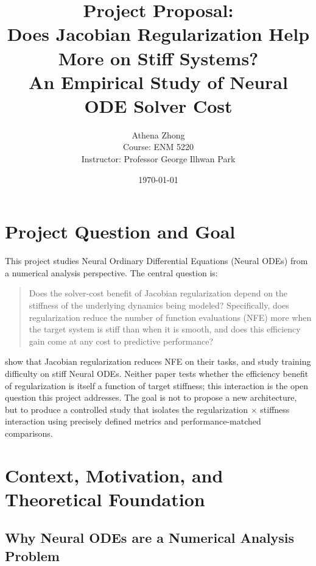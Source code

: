 \documentclass[11pt]{article}
\title{Project Proposal:\\
Does Jacobian Regularization Help More on Stiff Systems?\\
An Empirical Study of Neural ODE Solver Cost}
\author{Athena Zhong \\
Course: ENM 5220 \\
Instructor: Professor George Ilhwan Park}
\date{\today}
\begin{document}
\maketitle

\section{Project Question and Goal}

This project studies Neural Ordinary Differential Equations (Neural ODEs) from a numerical analysis perspective. The central question is:

\begin{quote}
Does the solver-cost benefit of Jacobian regularization depend on the stiffness of the underlying dynamics being modeled? Specifically, does regularization reduce the number of function evaluations (NFE) more when the target system is stiff than when it is smooth, and does this efficiency gain come at any cost to predictive performance?
\end{quote}
\citet{finlay2020trainnode} show that Jacobian regularization reduces NFE on their tasks, and \citet{kim2021stiffnode} study training difficulty on stiff Neural ODEs. Neither paper tests whether the efficiency benefit of regularization is itself a function of target stiffness; this interaction is the open question this project addresses. The goal is not to propose a new architecture, but to produce a controlled study that isolates the regularization $\times$ stiffness interaction using precisely defined metrics and performance-matched comparisons.

\section{Context, Motivation, and Theoretical Foundation}

\subsection{Why Neural ODEs are a Numerical Analysis Problem}
\end{document}
